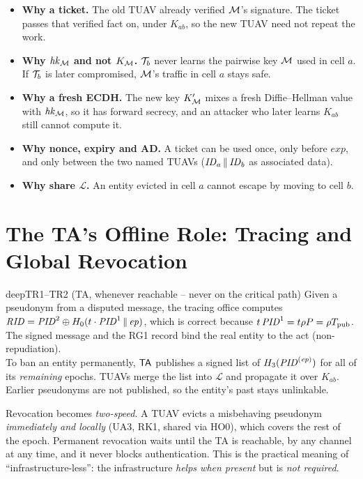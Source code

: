 \begin{whybox}
\begin{itemize}[leftmargin=*]
  \item \textbf{Why a ticket.} The old TUAV already verified $\mathcal{M}$'s signature. The ticket passes that verified fact on, under $K_{ab}$, so the new TUAV need not repeat the work.
  \item \textbf{Why $\mathit{hk}_{\mathcal{M}}$ and not $K_{\mathcal{M}}$.} $\mathcal{T}_b$ never learns the pairwise key $\mathcal{M}$ used in cell $a$. If $\mathcal{T}_b$ is later compromised, $\mathcal{M}$'s traffic in cell $a$ stays safe.
  \item \textbf{Why a fresh ECDH.} The new key $K'_{\mathcal{M}}$ mixes a fresh Diffie--Hellman value with $\mathit{hk}_{\mathcal{M}}$, so it has forward secrecy, and an attacker who later
        learns $K_{ab}$ still cannot compute it.
  \item \textbf{Why nonce, expiry and AD.} A ticket can be used once, only before $\mathit{exp}$, and only between the two named TUAVs ($\mathit{ID}_a\,\|\,\mathit{ID}_b$ as associated data).
  \item \textbf{Why share $\mathcal{L}$.} An entity evicted in cell $a$ cannot escape by moving to cell $b$.
\end{itemize}
\end{whybox}

\chapter{The TA's Offline Role: Tracing and Global Revocation}\label{sec:tr}
\begin{stepbox}{deep}{TR1--TR2 \;(TA, whenever reachable -- never on the critical path)}
 Given a pseudonym from a disputed message, the tracing office computes
$\mathit{RID}=\mathit{PID}^2\oplus H_0(t\cdot\mathit{PID}^1\,\|\,\mathit{ep})$, which is correct because $t\,\mathit{PID}^1=t\rho P=\rho T_{\mathrm{pub}}$. The signed message and the RG1 record bind the real
entity to the act (non-repudiation).\\[2pt]
 To ban an entity permanently, $\mathsf{TA}$ publishes a signed list of $H_3(\mathit{PID}^{(\mathit{ep})})$ for all of its \emph{remaining}
epochs. TUAVs merge the list into $\mathcal{L}$ and propagate it over $K_{ab}$. Earlier pseudonyms are not published, so the entity's past stays unlinkable.
\end{stepbox}
\begin{whybox}
Revocation becomes \emph{two-speed}. A TUAV evicts a misbehaving pseudonym \emph{immediately and locally} (UA3, RK1, shared via HO0), which covers the
rest of the epoch. Permanent revocation waits until the TA is reachable, by any channel at any time, and it never blocks authentication. This is the
practical meaning of ``infrastructure-less'': the infrastructure \emph{helps when present} but is \emph{not required}.
\end{whybox}
